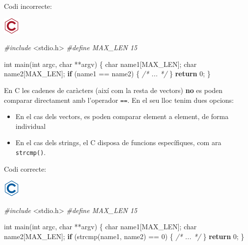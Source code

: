 \documentclass[
]{book}
\newenvironment{Shaded}{\begin{snugshade}}{\end{snugshade}}
\newcommand{\CommentTok}[1]{\textcolor[rgb]{0.56,0.35,0.01}{\textit{#1}}}
\newcommand{\ControlFlowTok}[1]{\textcolor[rgb]{0.13,0.29,0.53}{\textbf{#1}}}
\newcommand{\DataTypeTok}[1]{\textcolor[rgb]{0.13,0.29,0.53}{#1}}
\newcommand{\DecValTok}[1]{\textcolor[rgb]{0.00,0.00,0.81}{#1}}
\newcommand{\ImportTok}[1]{#1}
\newcommand{\NormalTok}[1]{#1}
\newcommand{\PreprocessorTok}[1]{\textcolor[rgb]{0.56,0.35,0.01}{\textit{#1}}}
\providecommand{\tightlist}{%
  \setlength{\itemsep}{0pt}\setlength{\parskip}{0pt}}
\begin{document}
Codi incorrecte:

\includegraphics{./img/c_err.png}

\begin{Shaded}
\begin{Highlighting}[]
\PreprocessorTok{\#include }\ImportTok{\textless{}stdio.h\textgreater{}}
\PreprocessorTok{\#define MAX\_LEN 15}

\DataTypeTok{int}\NormalTok{ main(}\DataTypeTok{int}\NormalTok{ argc, }\DataTypeTok{char}\NormalTok{ **argv) \{}
    \DataTypeTok{char}\NormalTok{ name1[MAX\_LEN];}
    \DataTypeTok{char}\NormalTok{ name2[MAX\_LEN];}
    \ControlFlowTok{if}\NormalTok{ (name1 == name2) \{}
        \CommentTok{/* ... */}
\NormalTok{    \}}
    \ControlFlowTok{return} \DecValTok{0}\NormalTok{;}
\NormalTok{\}}
\end{Highlighting}
\end{Shaded}

En C les cadenes de caràcters (així com la resta de vectors) \textbf{no} es poden comparar directament amb l'operador \texttt{==}. En el seu lloc tenim dues opcions:

\begin{itemize}
\tightlist
\item
  En el cas dels vectors, es poden comparar element a element, de forma individual
\item
  En el cas dels strings, el C disposa de funcions específiques, com ara \texttt{strcmp()}.
\end{itemize}

Codi correcte:

\includegraphics{./img/c.png}

\begin{Shaded}
\begin{Highlighting}[]
\PreprocessorTok{\#include }\ImportTok{\textless{}stdio.h\textgreater{}}
\PreprocessorTok{\#define MAX\_LEN 15}

\DataTypeTok{int}\NormalTok{ main(}\DataTypeTok{int}\NormalTok{ argc, }\DataTypeTok{char}\NormalTok{ **argv) \{}
    \DataTypeTok{char}\NormalTok{ name1[MAX\_LEN];}
    \DataTypeTok{char}\NormalTok{ name2[MAX\_LEN];}
    \ControlFlowTok{if}\NormalTok{ (strcmp(name1, name2) == }\DecValTok{0}\NormalTok{) \{}
        \CommentTok{/* ... */}
\NormalTok{    \}}
    \ControlFlowTok{return} \DecValTok{0}\NormalTok{;}
\NormalTok{\}}
\end{Highlighting}
\end{Shaded}
\end{document}
